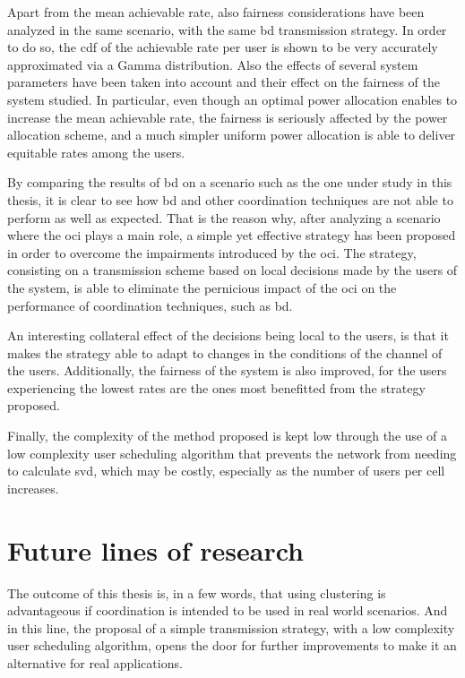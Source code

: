 Apart from the mean achievable rate, also fairness considerations have been
analyzed in the same scenario, with the same \gls{bd} transmission strategy. In
order to do so, the \gls{cdf} of the achievable rate per user is shown to be
very accurately approximated via a Gamma distribution. Also the effects of
several system parameters have been taken into account and their effect on the
fairness of the system studied. In particular, even though an optimal power
allocation enables to increase the mean achievable rate, the fairness is
seriously affected by the power allocation scheme, and a much simpler uniform
power allocation is able to deliver equitable rates among the users.

By comparing the results of \gls{bd} on a scenario such as the one under study
in this thesis, it is clear to see how \gls{bd} and other coordination
techniques are not able to perform as well as expected. That is the reason why,
after analyzing a scenario where the \gls{oci} plays a main role, a simple yet
effective strategy has been proposed in order to overcome the impairments
introduced by the \gls{oci}. The strategy, consisting on a transmission scheme
based on local decisions made by the users of the system, is able to eliminate
the pernicious impact of the \gls{oci} on the performance of coordination
techniques, such as \gls{bd}.

An interesting collateral effect of the decisions being local to the users, is
that it makes the strategy able to adapt to changes in the conditions of the
channel of the users. Additionally, the fairness of the system is also improved,
for the users experiencing the lowest rates are the ones most benefitted from
the strategy proposed.

Finally, the complexity of the method proposed is kept low through the use of a
low complexity user scheduling algorithm that prevents the network from needing
to calculate \gls{svd}, which may be costly, especially as the number of users
per cell increases.

\section{Future lines of research} \label{sec:future}

The outcome of this thesis is, in a few words, that using clustering is
advantageous if coordination is intended to be used in real world scenarios. And
in this line, the proposal of a simple transmission strategy, with a low
complexity user scheduling algorithm, opens the door for further improvements to
make it an alternative for real applications.

